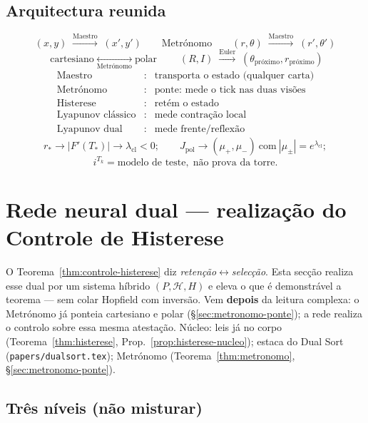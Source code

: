 \documentclass[11pt,a4paper]{article}
\newcommand{\code}[1]{\texttt{#1}}
\begin{document}
\subsection*{Arquitectura reunida}

\[
\boxed{
(x,y)
\;\xrightarrow{\text{Maestro}}\;
(x',y')
\qquad
\text{Metrónomo}
\qquad
(r,\theta)
\;\xrightarrow{\text{Maestro}}\;
(r',\theta')
}
\]
\[
\boxed{
\text{cartesiano}
\;\underset{\text{Metrónomo}}{\longleftrightarrow}\;
\text{polar}
}
\qquad
\boxed{
(R,I)
\;\overset{\text{Euler}}{\longrightarrow}\;
(\theta_{\mathrm{próximo}},r_{\mathrm{próximo}})
}
\]
\[
\boxed{
\begin{array}{rcl}
\text{Maestro} &\colon& \text{transporta o estado (qualquer carta)}\\
\text{Metrónomo} &\colon& \text{ponte: mede o tick nas duas visões}\\
\text{Histerese} &\colon& \text{retém o estado}\\
\text{Lyapunov clássico} &\colon& \text{mede contração local}\\
\text{Lyapunov dual} &\colon& \text{mede frente/reflexão}
\end{array}
}
\]
\[
\boxed{
r_{\ast}\to|F'(T_{\ast})|\to\lambda_{\mathrm{cl}}<0;
\qquad
J_{\mathrm{pol}}\to(\mu_{+},\mu_{-})\ \text{com}\ |\mu_{\pm}|=e^{\lambda_{\mathrm{cl}}};
}
\]
\[
\boxed{
i^{T_k}=\text{modelo de teste},\;\text{não prova da torre}.
}
\]

\section{Rede neural dual --- realização do Controle de Histerese}\label{sec:rede-dual}

O Teorema~\ref{thm:controle-histerese} diz \emph{retenção}$\leftrightarrow$\emph{selecção}.
Esta secção realiza esse dual por um sistema híbrido $(P,\mathcal{H},H)$
e eleva o que é demonstrável a teorema --- sem colar Hopfield com
inversão. Vem \textbf{depois} da leitura complexa: o Metrónomo já
ponteia cartesiano e polar (\S\ref{sec:metronomo-ponte}); a rede
realiza o controlo sobre essa mesma atestação. Núcleo: leis já no
corpo (Teorema~\ref{thm:histerese}, Prop.~\ref{prop:histerese-nucleo});
estaca do Dual Sort (\code{papers/dualsort.tex}); Metrónomo
(Teorema~\ref{thm:metronomo}, \S\ref{sec:metronomo-ponte}).

\subsection*{Três níveis (não misturar)}
\end{document}
